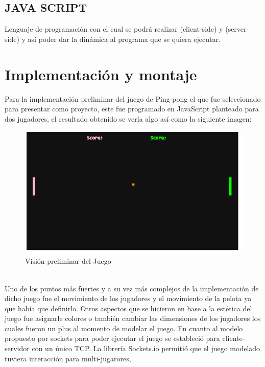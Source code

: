 \documentclass[spanish]{udpreport}
\begin{document}
\section{JAVA SCRIPT}
Lenguaje de programación con el cual se podrá realizar (client-side) y (server-side) y así poder dar la dinámica al programa que se quiera ejecutar.
\\[0.2cm]
\chapter{Implementación y montaje}
Para la implementación preliminar del juego de Ping-pong el que fue seleccionado para presentar como proyecto, este fue programado en JavaScript planteado para dos jugadores, el resultado obtenido se vería algo así como la siguiente imagen:
\begin{figure}[h]
    \centering
    \includegraphics[scale=0.5]{images/juego.png}
    \caption{Visión preliminar del Juego}
    \label{fig:my_label}
\end{figure}
\\ Uno de los puntos más fuertes  y a su vez más complejos de la implementación de dicho juego fue el movimiento de los jugadores y el movimiento de la pelota ya que había que definirlo. Otros aspectos que se hicieron en base a la estética del juego fue asignarle colores o también cambiar las dimensiones de los jugadores los cuales fueron un plus al momento de modelar el juego. 
\newpage En cuanto al modelo propuesto por sockets para poder ejecutar el juego se estableció para cliente-servidor con un único TCP. La librería Sockets.io permitió que el juego modelado tuviera interacción para multi-jugarores,  
\end{document}
